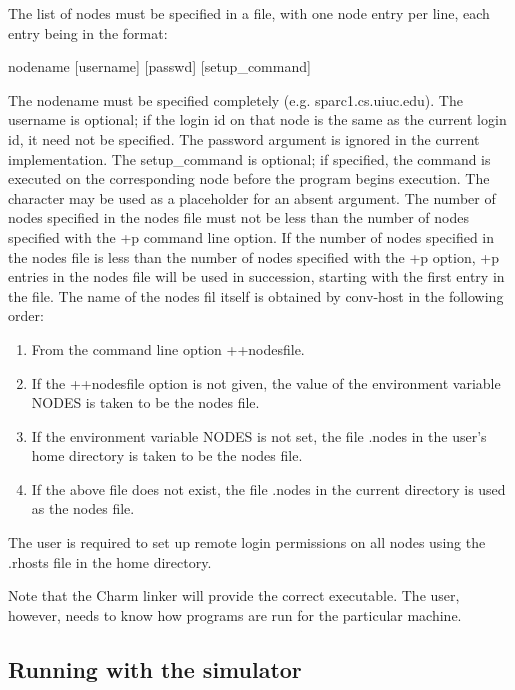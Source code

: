 \begin{itemize}
The list of nodes must be specified in a file, with one node entry per
line, each entry being in the format:

{\fexec nodename [username] [passwd] [setup\_command]}

The {\fparm nodename} must be specified completely (e.g. sparc1.cs.uiuc.edu).
The {\fparm username} is optional; if the login id on that node is the
same as the current login id, it need not be specified.
The {\fparm password} argument is ignored in the current implementation.
The {\fparm setup\_command} is optional; if specified,
the command is executed on the corresponding node before the program 
begins execution. The {\bf *} character may be used as a
placeholder for an absent argument.
The number of nodes specified in the nodes file must not be less
than the number of nodes specified with the {\fexec +p} command
line option. If the number of nodes specified in the nodes file is
less than the number of nodes specified with the {\fexec +p} option,
{\fexec +p} entries in the nodes file will be used in succession, starting
with the first entry in the file.
The name of the nodes fil itself is
obtained by  {\fexec conv-host} in the following order:
\begin{enumerate}
\item	From the command line option {\fexec ++nodesfile}.
\item	If the {\fexec ++nodesfile} option is not given, the value of the 
environment variable {\fexec NODES} is taken to be the nodes file.
\item	If the environment variable {\fexec NODES} is not set, the file 
{\fparm .nodes} in the user's home directory is taken 
to be the nodes file.
\item	If the above file does not exist, the file 
{\fparm .nodes} in the current
directory is used as  the nodes file.
\end{enumerate}
The user is required to set up remote login permissions on all nodes
using the .rhosts file in the home directory.

\end{itemize}

Note that the Charm linker will provide the correct 
executable. The user, however, needs to know how programs are run for
the particular machine.

\subsection[Running with the simulator]{Running with the simulator}

